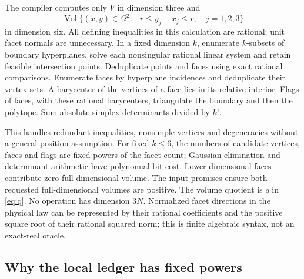 \documentclass[11pt]{article}
\numberwithin{equation}{section}
\theoremstyle{definition}
\theoremstyle{remark}\newtheorem{remark}[theorem]{Remark}
\newcommand{\Vol}{\operatorname{Vol}}
\begin{document}
The compiler computes only $V$ in dimension three and
\[
 \Vol\{(x,y)\in\Omega^2:-r\le y_j-x_j\le r,\quad j=1,2,3\}
\]
in dimension six. All defining inequalities in this calculation are
rational; unit facet normals are unnecessary. In a fixed dimension $k$,
enumerate $k$-subsets of boundary hyperplanes, solve each nonsingular
rational linear system and retain feasible intersection points. Deduplicate
points and faces using exact rational comparisons. Enumerate faces by
hyperplane incidences and deduplicate their vertex sets. A barycenter of
the vertices of a face lies in its relative interior. Flags of faces,
with these rational barycenters, triangulate the boundary and then the
polytope. Sum absolute simplex determinants divided by $k!$.

This handles redundant inequalities, nonsimple vertices and degeneracies
without a general-position assumption. For fixed $k\le6$, the numbers of
candidate vertices, faces and flags are fixed powers of the facet count;
Gaussian elimination and determinant arithmetic have polynomial bit cost.
Lower-dimensional faces contribute zero full-dimensional volume. The
input promises ensure both requested full-dimensional volumes are positive.
The volume quotient is $q$ in \eqref{eq:q}. No operation has dimension
$3N$. Normalized facet directions in the physical law can be represented
by their rational coefficients and the positive square root of their
rational squared norm; this is finite algebraic syntax, not an exact-real
oracle.

\subsection{Why the local ledger has fixed powers}
\end{document}

